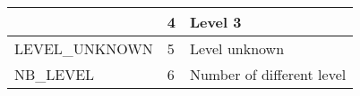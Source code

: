 \documentclass{template/openetcs_article}
\begin{document}
\begin{longtable}{|l|l|l|}
	&	\begin{minipage}[t]{0.10\linewidth} 4 \end{minipage} 
	&	\begin{minipage}[t]{0.50\linewidth} Level 3 \end{minipage}\\
	\hline
		\begin{minipage}[t]{0.45\linewidth} LEVEL\_UNKNOWN \end{minipage} 
	&	\begin{minipage}[t]{0.10\linewidth} 5 \end{minipage} 
	&	\begin{minipage}[t]{0.50\linewidth} Level unknown \end{minipage}\\
	\hline
		\begin{minipage}[t]{0.45\linewidth} NB\_LEVEL \end{minipage} 
	&	\begin{minipage}[t]{0.10\linewidth} 6 \end{minipage} 
	&	\begin{minipage}[t]{0.50\linewidth} Number of different level \end{minipage}\\
	\hline
\end{longtable}
\end{document}
